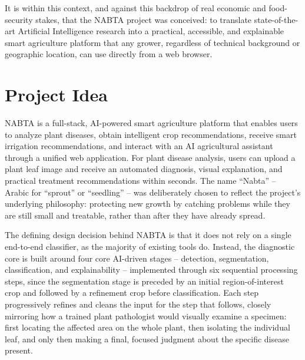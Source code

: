 It is within this context, and against this backdrop of real economic and food-security stakes, that the NABTA project was conceived: to translate state-of-the-art Artificial Intelligence research into a practical, accessible, and explainable smart agriculture platform that any grower, regardless of technical background or geographic location, can use directly from a web browser.

\section{Project Idea}
\label{sec:intro_idea}

NABTA is a full-stack, AI-powered smart agriculture platform that enables users to analyze plant diseases, obtain intelligent crop recommendations, receive smart irrigation recommendations, and interact with an AI agricultural assistant through a unified web application. For plant disease analysis, users can upload a plant leaf image and receive an automated diagnosis, visual explanation, and practical treatment recommendations within seconds. The name ``Nabta'' -- Arabic for ``sprout'' or ``seedling'' -- was deliberately chosen to reflect the project's underlying philosophy: protecting new growth by catching problems while they are still small and treatable, rather than after they have already spread.

The defining design decision behind NABTA is that it does not rely on a single end-to-end classifier, as the majority of existing tools do. Instead, the diagnostic core is built around four core AI-driven stages -- detection, segmentation, classification, and explainability -- implemented through six sequential processing steps, since the segmentation stage is preceded by an initial region-of-interest crop and followed by a refinement crop before classification. Each step progressively refines and cleans the input for the step that follows, closely mirroring how a trained plant pathologist would visually examine a specimen: first locating the affected area on the whole plant, then isolating the individual leaf, and only then making a final, focused judgment about the specific disease present.

